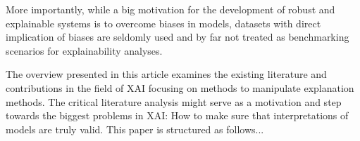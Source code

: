 More importantly, while a big motivation for the development of robust and explainable systems is to overcome biases in models, datasets with 
direct implication of biases are seldomly used and by far not treated as benchmarking scenarios for explainability analyses.  






The overview presented in this article examines the existing literature and contributions in the field of XAI focusing on methods to manipulate explanation methods.  
The critical literature analysis might serve as a motivation and step towards the biggest problems in XAI: How to make sure that interpretations of models are truly valid. 
This paper is structured as follows... 
